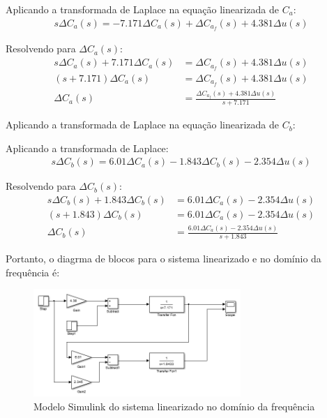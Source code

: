 \documentclass[a4paper,12pt]{report}
\begin{document}
Aplicando a transformada de Laplace na equação linearizada de \(C_a\):
\begin{align}
s \Delta C_a(s) = -7.171 \Delta C_a(s) + \Delta C_{a_f}(s) + 4.381 \Delta u(s)
\end{align}

Resolvendo para \(\Delta C_a(s)\):
\begin{align}
s \Delta C_a(s) + 7.171 \Delta C_a(s) &= \Delta C_{a_f}(s) + 4.381 \Delta u(s) \\
(s + 7.171) \Delta C_a(s) &= \Delta C_{a_f}(s) + 4.381 \Delta u(s) \\
\Delta C_a(s) &= \frac{\Delta C_{a_f}(s) + 4.381 \Delta u(s)}{s + 7.171}
\end{align}

Aplicando a transformada de Laplace na equação linearizada de \(C_b\):

Aplicando a transformada de Laplace:
\begin{align}
s \Delta C_b(s) = 6.01 \Delta C_a(s) - 1.843 \Delta C_b(s) - 2.354 \Delta u(s)
\end{align}

Resolvendo para \(\Delta C_b(s)\):
\begin{align}
s \Delta C_b(s) + 1.843 \Delta C_b(s) &= 6.01 \Delta C_a(s) - 2.354 \Delta u(s) \\
(s + 1.843) \Delta C_b(s) &= 6.01 \Delta C_a(s) - 2.354 \Delta u(s) \\
\Delta C_b(s) &= \frac{6.01 \Delta C_a(s) - 2.354 \Delta u(s)}{s + 1.843}
\end{align}

Portanto, o diagrma de blocos para o sistema linearizado e no domínio da frequência é:

\begin{figure}[H]
  \centering
  \includegraphics[width=0.7\textwidth]{Imagens/Q3SimuS.png}
  \caption{Modelo Simulink do sistema linearizado no domínio da frequência}
  \end{figure}
\end{document}
